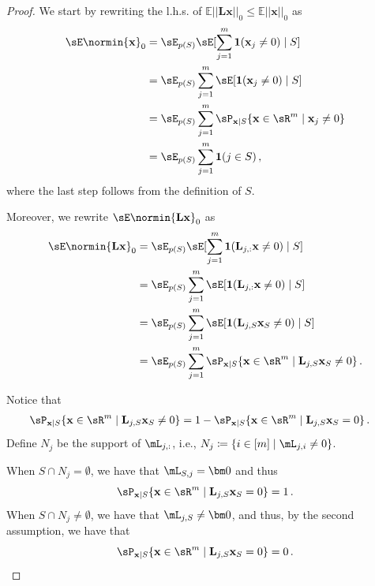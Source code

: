 \documentclass{article}
\newcommand{\x}{\mathbf{x}}
\begin{document}
\begin{proof}
    We start by rewriting the l.h.s. of $\mathbb{E}||\mathbf{L}\x||_0 \leq \mathbb{E}||\x||_0$ as
\begin{align}
    \sE\normin{\x}_{0} &= \sE_{p(S)}\sE[\sum_{j=1}^m \mathbf{1}(\x_j \not= 0) \mid S] \\
    &= \sE_{p(S)}\sum_{j=1}^m \sE[\mathbf{1}(\x_j \not= 0) \mid S] \\
    &= \sE_{p(S)}\sum_{j=1}^m \sP_{\x \mid S}\{\x \in \sR^m \mid \x_{j} \not= 0\}\\
    &= \sE_{p(S)}\sum_{j=1}^m \mathbf{1}(j \in S)\,,
\end{align}
where the last step follows from the definition of $S$.

Moreover, we rewrite $\sE\normin{\mathbf{L}\x}_{0}$ as
\begin{align}
    \sE\normin{\mathbf{L}\x}_{0} &= \sE_{p(S)}\sE[\sum_{j=1}^m \mathbf{1}(\mathbf{L}_{j, :}\x \not= 0)\mid S]\\
    &= \sE_{p(S)}\sum_{j=1}^m \sE[\mathbf{1}(\mathbf{L}_{j, :}\x \not= 0)\mid S]\\
    &= \sE_{p(S)}\sum_{j=1}^m \sE[\mathbf{1}(\mathbf{L}_{j, S}\x_S \not= 0)\mid S]\\
    &= \sE_{p(S)}\sum_{j=1}^m \sP_{\x \mid S}\{ \x \in \sR^m \mid \mathbf{L}_{j, S}\x_S \not= 0\} \,.
\end{align}

Notice that
\begin{align}
    \sP_{\x \mid S}\{ \x \in \sR^m \mid \mathbf{L}_{j, S}\x_S \not= 0\} &= 1 - \sP_{\x \mid S}\{ \x \in \sR^m \mid \mathbf{L}_{j, S}\x_S = 0\}\,. %
\end{align}
Define $N_j$ be the support of $\mL_{j, :}$, i.e., $N_j \coloneqq \{i \in [m] \mid \mL_{j, i} \not= 0 \}$. 

When $S \cap N_j = \emptyset$, we have that $\mL_{S,j} = \bm0$ and thus
$$\sP_{\x \mid S}\{ \x \in \sR^m \mid \mathbf{L}_{j, S}\x_S = 0\} = 1 \,.$$ 
When $S \cap N_j \not= \emptyset$, we have that $\mL_{j,S} \not= \bm0$, and thus, by the second assumption, we have that 
$$\sP_{\x \mid S}\{ \x \in \sR^m \mid \mathbf{L}_{j, S}\x_S = 0\} = 0 \,.$$ 


\end{proof}
\end{document}
